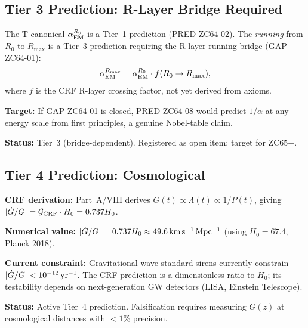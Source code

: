\documentclass[12pt, a4paper]{article}
\renewcommand{\aEM}{\alpha_{\rm EM}}
\begin{document}
\subsection{Tier 3 Prediction: R-Layer Bridge Required}
\label{sec:tier3}

\begin{predbox}[title={PRED-ZC64-08 (Preview): Full $\aEM$
  Cascade (Tier~3)}]
The T-canonical $\aEM^{R_0}$ is a Tier~1 prediction
(PRED-ZC64-02). The \emph{running} from $R_0$ to $R_{\max}$
is a Tier~3 prediction requiring the R-layer running bridge
(GAP-ZC64-01):
\[
  \aEM^{R_{\max}} = \aEM^{R_0} \cdot f(R_0 \to R_{\max}),
\]
where $f$ is the CRF R-layer crossing factor, not yet
derived from axioms.

\textbf{Target:} If GAP-ZC64-01 is closed, PRED-ZC64-08
would predict $1/\alpha$ at any energy scale from first
principles, a genuine Nobel-table claim.

\textbf{Status:} Tier~3 (bridge-dependent). Registered as
open item; target for ZC65+.
\end{predbox}

\subsection{Tier 4 Prediction: Cosmological}
\label{sec:tier4}

\begin{predbox}[title={PRED-ZC64-09: $|\dot{G}/G| = \Gcoup \cdot H_0$
  (Tier~4, Cosmological)}]
\textbf{CRF derivation:} Part~A/VIII derives
$G(t) \propto \Lambda(t) \propto 1/P(t)$, giving
$|\dot{G}/G| = \mathcal{G}_{\rm CRF} \cdot H_0 = 0.737 H_0$.

\textbf{Numerical value:}
$|\dot{G}/G| = 0.737 H_0 \approx 49.6\,\rm km\,s^{-1}\,Mpc^{-1}$
(using $H_0 = 67.4$, Planck 2018).

\textbf{Current constraint:} Gravitational wave standard
sirens currently constrain $|\dot{G}/G| < 10^{-12}\,\rm yr^{-1}$.
The CRF prediction is a dimensionless ratio to $H_0$;
its testability depends on next-generation GW detectors
(LISA, Einstein Telescope).

\textbf{Status:} Active Tier~4 prediction.
Falsification requires measuring $G(z)$ at cosmological
distances with $<\!1\%$ precision.
\end{predbox}
\end{document}
